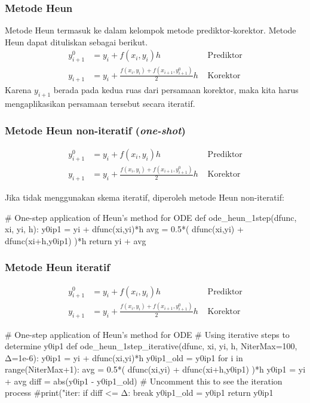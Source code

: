 \begin{frame}
\frametitle{Metode Heun}

Metode Heun termasuk ke dalam kelompok metode prediktor-korektor. Metode Heun dapat
dituliskan sebagai berikut.
\begin{align}
y^{0}_{i+1} & = y_{i} + f(x_i, y_i) h & \text{   Prediktor}\\
y_{i+1} & = y_{i} + \frac{f(x_i, y_i) + f(x_{i+1}, y^{0}_{i+1})}{2} h & \text{   Korektor}
\end{align}
Karena $y_{i+1}$ berada pada kedua ruas dari persamaan korektor, maka kita harus mengaplikasikan
persamaan tersebut secara iteratif.

\end{frame}


\begin{frame}[fragile]
\frametitle{Metode Heun non-iteratif (\textit{one-shot})}

\begin{align*}
y^{0}_{i+1} & = y_{i} + f(x_i, y_i) h & \text{   Prediktor}\\
y_{i+1} & = y_{i} + \frac{f(x_i, y_i) + f(x_{i+1}, y^{0}_{i+1})}{2} h & \text{   Korektor}
\end{align*}

Jika tidak menggunakan skema iteratif, diperoleh metode Heun non-iteratif:
\begin{pythoncode}
# One-step application of Heun's method for ODE
def ode_heun_1step(dfunc, xi, yi, h):
    y0ip1 = yi + dfunc(xi,yi)*h
    avg = 0.5*( dfunc(xi,yi) + dfunc(xi+h,y0ip1) )*h
    return yi + avg
\end{pythoncode}

\end{frame}



\begin{frame}[fragile]
\frametitle{Metode Heun iteratif}

\begin{align*}
y^{0}_{i+1} & = y_{i} + f(x_i, y_i) h & \text{   Prediktor}\\
y_{i+1} & = y_{i} + \frac{f(x_i, y_i) + f(x_{i+1}, y^{0}_{i+1})}{2} h & \text{   Korektor}
\end{align*}

\begin{pythoncode}
# One-step application of Heun's method for ODE
# Using iterative steps to determine y0ip1
def ode_heun_1step_iterative(dfunc, xi, yi, h, NiterMax=100, Δ=1e-6):
    y0ip1 = yi + dfunc(xi,yi)*h
    y0ip1_old = y0ip1
    for i in range(NiterMax+1):
        avg = 0.5*( dfunc(xi,yi) + dfunc(xi+h,y0ip1) )*h
        y0ip1 = yi + avg
        diff = abs(y0ip1 - y0ip1_old)
        # Uncomment this to see the iteration process
        #print("iter: %
        if diff <= Δ:
            break
        y0ip1_old = y0ip1
    return y0ip1
\end{pythoncode}

\end{frame}


